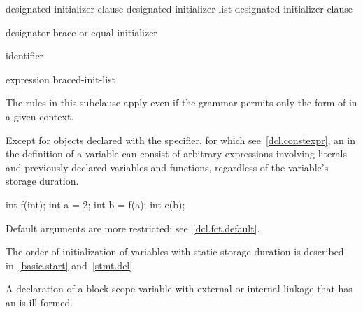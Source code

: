 \begin{bnf}
\br
    designated-initializer-clause\br
    designated-initializer-list \terminal{,} designated-initializer-clause
\end{bnf}

\begin{bnf}
\br
    designator brace-or-equal-initializer
\end{bnf}

\begin{bnf}
\br
     identifier
\end{bnf}

\begin{bnf}
\br
    expression\br
    braced-init-list
\end{bnf}

\begin{note}
The rules in this subclause apply even if the grammar permits only
the  form
of  in a given context.
\end{note}

\pnum
Except for objects declared with the  specifier, for which see~\ref{dcl.constexpr},
an  in the definition of a variable can consist of
arbitrary
%
%
expressions involving literals and previously declared
variables and functions,
regardless of the variable's storage duration.
\begin{example}

\begin{codeblock}
int f(int);
int a = 2;
int b = f(a);
int c(b);
\end{codeblock}
\end{example}

\pnum
\begin{note}
Default arguments are more restricted; see~\ref{dcl.fct.default}.
\end{note}

\pnum
\begin{note}
The order of initialization of variables with static storage duration is described in~\ref{basic.start}
and~\ref{stmt.dcl}.
\end{note}

\pnum
A declaration of a block-scope variable with external or internal
linkage that has an  is ill-formed.

